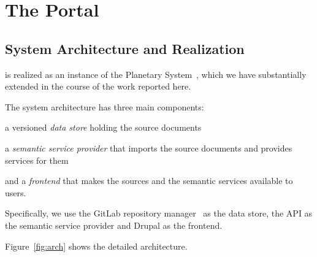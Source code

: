 \section{The \sys Portal}\label{sec:mathhub}

\subsection{ System Architecture and Realization}\label{sec:arch}

\sys is realized as an instance of the Planetary System~\cite{Kohlhase:ppte12}, which we
have substantially extended in the course of the work reported here.

The system architecture has three main components: 
\begin{compactenum}[\em i\rm)]
 \item a versioned \emph{data store} holding the source documents
 \item a \emph{semantic service provider} that imports the source documents and provides services for them 
 \item and a \emph{frontend} that makes the sources and the semantic services available to users.
\end{compactenum}
Specifically, we use the GitLab repository manager~\cite{GitLab:on} as the data store, the
\mmt API as the semantic service provider and Drupal as the frontend.

Figure~\ref{fig:arch} shows the detailed architecture.

